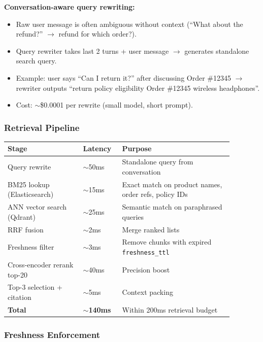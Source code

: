 \textbf{Conversation-aware query rewriting:}

\begin{itemize}
  \item Raw user message is often ambiguous without context (``What about the refund?'' $\rightarrow$ refund for which order?).
  \item Query rewriter takes last 2 turns + user message $\rightarrow$ generates standalone search query.
  \item Example: user says ``Can I return it?'' after discussing Order \#12345 $\rightarrow$ rewriter outputs ``return policy eligibility Order \#12345 wireless headphones''.
  \item Cost: $\sim$\$0.0001 per rewrite (small model, short prompt).
\end{itemize}

\subsubsection*{Retrieval Pipeline}

\small
\begin{tabular}{|p{0.30\linewidth}|p{0.14\linewidth}|p{0.44\linewidth}|}
\hline
\textbf{Stage} & \textbf{Latency} & \textbf{Purpose} \\
\hline
Query rewrite & $\sim$50ms & Standalone query from conversation \\
\hline
BM25 lookup (Elasticsearch) & $\sim$15ms & Exact match on product names, order refs, policy IDs \\
\hline
ANN vector search (Qdrant) & $\sim$25ms & Semantic match on paraphrased queries \\
\hline
RRF fusion & $\sim$2ms & Merge ranked lists \\
\hline
Freshness filter & $\sim$3ms & Remove chunks with expired \texttt{freshness\_ttl} \\
\hline
Cross-encoder rerank top-20 & $\sim$40ms & Precision boost \\
\hline
Top-3 selection + citation & $\sim$5ms & Context packing \\
\hline
\textbf{Total} & \textbf{$\sim$140ms} & Within 200ms retrieval budget \\
\hline
\end{tabular}
\normalsize

\subsubsection*{Freshness Enforcement}

